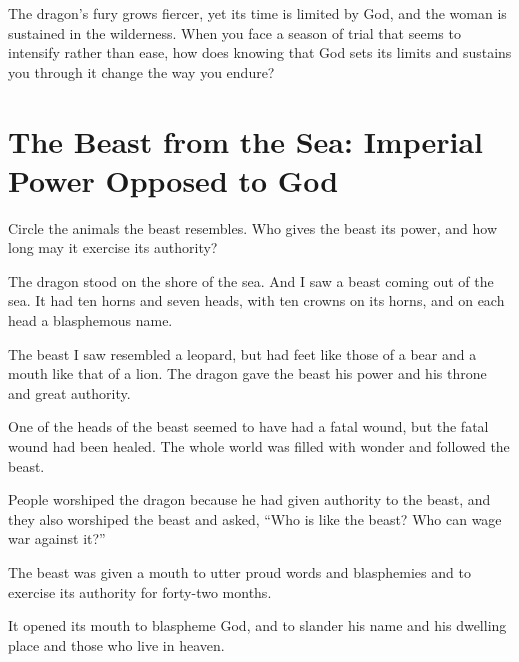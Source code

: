 \begin{ReaderQuestion}
The dragon's fury grows fiercer, yet its time is limited by God, and the woman is sustained in the wilderness. When you face a season of trial that seems to intensify rather than ease, how does knowing that God sets its limits and sustains you through it change the way you endure?
\end{ReaderQuestion}



\section{The Beast from the Sea: Imperial Power Opposed to God}

\begin{ScriptureBox2}{Circle the animals the beast resembles. Who gives the beast its power, and how long may it exercise its authority?}

\item[13:1] The dragon stood on the shore of the sea. And I saw a beast coming out of the sea. It had ten horns and seven heads, with ten crowns on its horns, and on each head a blasphemous name.

\item[13:2] The beast I saw resembled a leopard, but had feet like those of a bear and a mouth like that of a lion. The dragon gave the beast his power and his throne and great authority.

\item[13:3] One of the heads of the beast seemed to have had a fatal wound, but the fatal wound had been healed. The whole world was filled with wonder and followed the beast.

\item[13:4] People worshiped the dragon because he had given authority to the beast, and they also worshiped the beast and asked, ``Who is like the beast? Who can wage war against it?''

\item[13:5] The beast was given a mouth to utter proud words and blasphemies and to exercise its authority for forty-two months.

\item[13:6] It opened its mouth to blaspheme God, and to slander his name and his dwelling place and those who live in heaven.


\end{ScriptureBox2}
